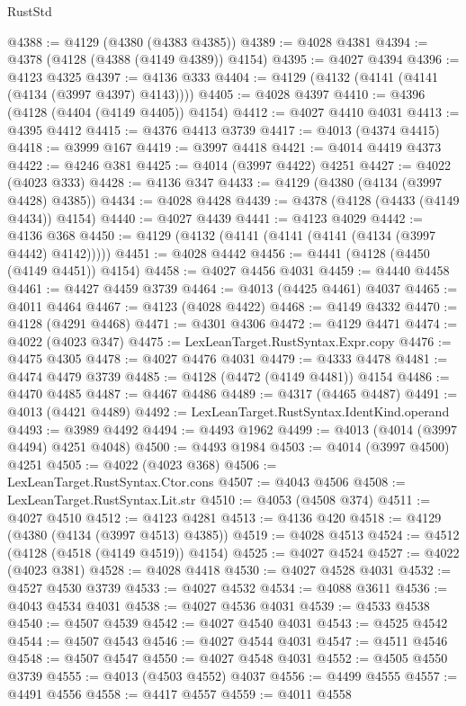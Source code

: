 \begin{lexlean}{RustStd}
\begin{coremodule}
@4388 := @4129 (@4380 (@4383 @4385))
@4389 := @4028 @4381
@4394 := @4378 (@4128 (@4388 (@4149 @4389)) @4154)
@4395 := @4027 @4394
@4396 := @4123 @4325
@4397 := @4136 @333
@4404 := @4129 (@4132 (@4141 (@4141 (@4134 (@3997 @4397) @4143))))
@4405 := @4028 @4397
@4410 := @4396 (@4128 (@4404 (@4149 @4405)) @4154)
@4412 := @4027 @4410 @4031
@4413 := @4395 @4412
@4415 := @4376 @4413 @3739
@4417 := @4013 (@4374 @4415)
@4418 := @3999 @167
@4419 := @3997 @4418
@4421 := @4014 @4419 @4373
@4422 := @4246 @381
@4425 := @4014 (@3997 @4422) @4251
@4427 := @4022 (@4023 @333)
@4428 := @4136 @347
@4433 := @4129 (@4380 (@4134 (@3997 @4428) @4385))
@4434 := @4028 @4428
@4439 := @4378 (@4128 (@4433 (@4149 @4434)) @4154)
@4440 := @4027 @4439
@4441 := @4123 @4029
@4442 := @4136 @368
@4450 := @4129 (@4132 (@4141 (@4141 (@4141 (@4134 (@3997 @4442) @4142)))))
@4451 := @4028 @4442
@4456 := @4441 (@4128 (@4450 (@4149 @4451)) @4154)
@4458 := @4027 @4456 @4031
@4459 := @4440 @4458
@4461 := @4427 @4459 @3739
@4464 := @4013 (@4425 @4461) @4037
@4465 := @4011 @4464
@4467 := @4123 (@4028 @4422)
@4468 := @4149 @4332
@4470 := @4128 (@4291 @4468)
@4471 := @4301 @4306
@4472 := @4129 @4471
@4474 := @4022 (@4023 @347)
@4475 := LexLeanTarget.RustSyntax.Expr.copy
@4476 := @4475 @4305
@4478 := @4027 @4476 @4031
@4479 := @4333 @4478
@4481 := @4474 @4479 @3739
@4485 := @4128 (@4472 (@4149 @4481)) @4154
@4486 := @4470 @4485
@4487 := @4467 @4486
@4489 := @4317 (@4465 @4487)
@4491 := @4013 (@4421 @4489)
@4492 := LexLeanTarget.RustSyntax.IdentKind.operand
@4493 := @3989 @4492
@4494 := @4493 @1962
@4499 := @4013 (@4014 (@3997 @4494) @4251 @4048)
@4500 := @4493 @1984
@4503 := @4014 (@3997 @4500) @4251
@4505 := @4022 (@4023 @368)
@4506 := LexLeanTarget.RustSyntax.Ctor.cons
@4507 := @4043 @4506
@4508 := LexLeanTarget.RustSyntax.Lit.str
@4510 := @4053 (@4508 @374)
@4511 := @4027 @4510
@4512 := @4123 @4281
@4513 := @4136 @420
@4518 := @4129 (@4380 (@4134 (@3997 @4513) @4385))
@4519 := @4028 @4513
@4524 := @4512 (@4128 (@4518 (@4149 @4519)) @4154)
@4525 := @4027 @4524
@4527 := @4022 (@4023 @381)
@4528 := @4028 @4418
@4530 := @4027 @4528 @4031
@4532 := @4527 @4530 @3739
@4533 := @4027 @4532
@4534 := @4088 @3611
@4536 := @4043 @4534 @4031
@4538 := @4027 @4536 @4031
@4539 := @4533 @4538
@4540 := @4507 @4539
@4542 := @4027 @4540 @4031
@4543 := @4525 @4542
@4544 := @4507 @4543
@4546 := @4027 @4544 @4031
@4547 := @4511 @4546
@4548 := @4507 @4547
@4550 := @4027 @4548 @4031
@4552 := @4505 @4550 @3739
@4555 := @4013 (@4503 @4552) @4037
@4556 := @4499 @4555
@4557 := @4491 @4556
@4558 := @4417 @4557
@4559 := @4011 @4558

\end{coremodule}
\end{lexlean}
